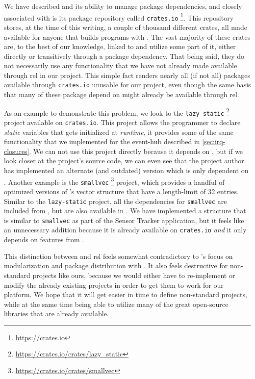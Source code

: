 We have described {\cargo} and its ability to manage package dependencies, and closely associated with {\cargo} is its package repository called \texttt{crates.io} \footnote{\url{https://crates.io}}.
This repository stores, at the time of this writing, a couple of thousand different {\rust} crates, all made available for anyone that builds {\rust} programs with {\cargo}.
The vast majority of these crates are, to the best of our knowledge, linked to {\std} and utilize some part of it, either directly or transitively through a package dependency.
That being said, they do not necessarily use any functionality that we have not already made available through \gls{rel} in our project.
This simple fact renders nearly all (if not all) packages available through \texttt{crates.io} unusable for our project, even though the same basis that many of these package depend on might already be available through \gls{rel}.

As an example to demonstrate this problem, we look to the \texttt{lazy-static} \footnote{\url{https://crates.io/crates/lazy_static}} project available on \texttt{crates.io}.
This project allows the programmer to declare \emph{static} variables that gets initialized at \emph{runtime}, it provides some of the same functionality that we implemented for the event-hub described in \autoref{sec:irq-closures}.
We can not use this project directly because it depends on {\std}, but if we look closer at the project's source code, we can even see that the project author has implemented an alternate (and outdated) version which is only dependent on {\core}.
Another example is the \texttt{smallvec} \footnote{\url{https://crates.io/crates/smallvec}} project, which provides a handful of optimized versions of {\rust}'s vector structure that have a length-limit of 32 entries.
Similar to the \texttt{lazy-static} project, all the dependencies for \texttt{smallvec} are included from {\std}, but are also available in {\core}.
We have implemented a structure that is similar to \texttt{smallvec} as part of the Sensor Tracker application, but it feels like an unnecessary addition because it is already available on \texttt{crates.io} \emph{and} it only depends on features from {\core}.

This distinction between {\std} and \gls{rsl} feels somewhat contradictory to {\rust}'s focus on modularization and package distribution with {\cargo}.
It also feels destructive for non-standard projects like ours, because we would either have to re-implement or modify the already existing projects in order to get them to work for our platform.
We hope that it will get easier in time to define non-standard projects, while at the same time being able to utilize many of the great open-source libraries that are already available.

